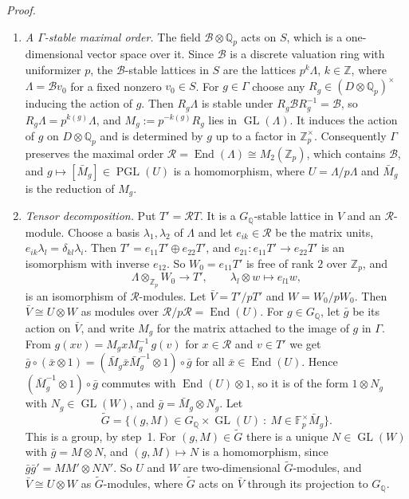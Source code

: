 \documentclass[11pt]{article}
\newcommand{\Q}{\mathbb Q}
\newcommand{\Z}{\mathbb Z}
\newcommand{\F}{\mathbb F}
\DeclareMathOperator{\End}{End}
\DeclareMathOperator{\GL}{GL}
\DeclareMathOperator{\PGL}{PGL}
\begin{document}
\emph{Proof.}
\begin{enumerate}
\item \emph{A \(\Gamma\)-stable maximal order.} The field \(\mathcal B\otimes\Q_p\) acts on \(S\), which
is a one-dimensional vector space over it. Since \(\mathcal B\) is a discrete valuation ring with
uniformizer \(p\), the \(\mathcal B\)-stable lattices in \(S\) are the lattices \(p^k\Lambda\),
\(k\in\Z\), where \(\Lambda=\mathcal Bv_0\) for a fixed nonzero \(v_0\in S\). For \(g\in\Gamma\) choose
any \(R_g\in(D\otimes\Q_p)^\times\) inducing the action of \(g\). Then \(R_g\Lambda\) is stable under
\(R_g\mathcal BR_g^{-1}=\mathcal B\), so \(R_g\Lambda=p^{k(g)}\Lambda\), and \(M_g:=p^{-k(g)}R_g\) lies in
\(\GL(\Lambda)\). It induces the action of \(g\) on \(D\otimes\Q_p\) and is determined by \(g\)
up to a factor in \(\Z_p^\times\). Consequently \(\Gamma\) preserves the maximal order
\(\mathcal R=\End(\Lambda)\cong M_2(\Z_p)\), which contains \(\mathcal B\), and
\(g\mapsto[\bar M_g]\in\PGL(U)\) is a homomorphism, where \(U=\Lambda/p\Lambda\) and
\(\bar M_g\) is the reduction of \(M_g\).

\item \emph{Tensor decomposition.} Put \(T'=\mathcal RT\). It is a \(G_{\Q}\)-stable lattice in
\(V\) and an \(\mathcal R\)-module. Choose a basis \(\lambda_1,\lambda_2\) of \(\Lambda\) and let
\(e_{ik}\in\mathcal R\) be the matrix units, \(e_{ik}\lambda_l=\delta_{kl}\lambda_i\). Then
\(T'=e_{11}T'\oplus e_{22}T'\), and \(e_{21}:e_{11}T'\to e_{22}T'\) is an isomorphism with
inverse \(e_{12}\). So \(W_0=e_{11}T'\) is free of rank \(2\) over \(\Z_p\), and
\[\Lambda\otimes_{\Z_p}W_0\to T',\qquad\lambda_l\otimes w\mapsto e_{l1}w,\]
is an isomorphism of \(\mathcal R\)-modules. Let \(\bar V=T'/pT'\) and \(W=W_0/pW_0\). Then
\(\bar V\cong U\otimes W\) as modules over \(\mathcal R/p\mathcal R=\End(U)\). For
\(g\in G_{\Q}\), let \(\bar g\) be its action on \(\bar V\), and write \(M_g\) for the matrix
attached to the image of \(g\) in \(\Gamma\). From \(g(xv)=M_gxM_g^{-1}\,g(v)\) for
\(x\in\mathcal R\) and \(v\in T'\) we get
\(\bar g\circ(\bar x\otimes1)=(\bar M_g\bar x\bar M_g^{-1}\otimes1)\circ\bar g\) for all
\(\bar x\in\End(U)\). Hence \((\bar M_g^{-1}\otimes1)\circ\bar g\) commutes with
\(\End(U)\otimes1\), so it is of the form \(1\otimes N_g\) with \(N_g\in\GL(W)\), and
\(\bar g=\bar M_g\otimes N_g\). Let
\[\tilde G=\{(g,M)\in G_{\Q}\times\GL(U)\ :\ M\in\F_p^\times\bar M_g\}.\]
This is a group, by step~1. For \((g,M)\in\tilde G\) there is a unique \(N\in\GL(W)\) with
\(\bar g=M\otimes N\), and \((g,M)\mapsto N\) is a homomorphism, since
\(\bar g\bar g'=MM'\otimes NN'\). So \(U\) and \(W\) are two-dimensional \(\tilde G\)-modules,
and \(\bar V\cong U\otimes W\) as \(\tilde G\)-modules, where \(\tilde G\) acts on \(\bar V\)
through its projection to \(G_{\Q}\).


\end{enumerate}
\end{document}
